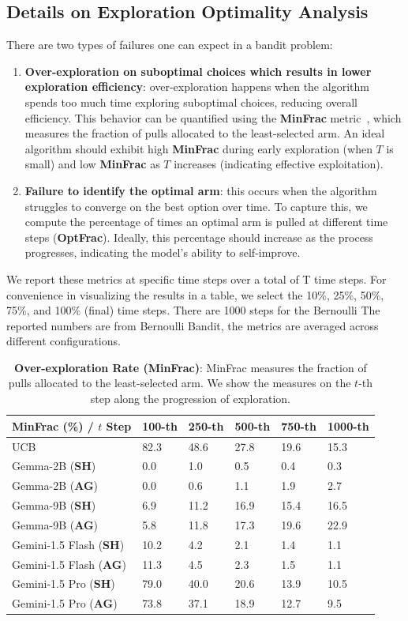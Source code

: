 \documentclass[11pt, logo]{googledeepmind}
\newcommand{\SH}{\textbf{SH}\xspace}
\newcommand{\AG}{\textbf{AG}\xspace}
\theoremstyle{plain}
\theoremstyle{definition}
\begin{document}
\subsection{Details on Exploration Optimality Analysis}
\label{app:sec:optimality}
There are two types of failures one can expect in a bandit problem:
\begin{enumerate}
    \item \textbf{Over-exploration on suboptimal choices which results in lower exploration efficiency}: over-exploration happens when the algorithm spends too much time exploring suboptimal choices, reducing overall efficiency. This behavior can be quantified using the \textbf{MinFrac} metric~\citep{krishnamurthy2024can}, which measures the fraction of pulls allocated to the least-selected arm. An ideal algorithm should exhibit high \textbf{MinFrac} during early exploration (when $T$ is small) and low \textbf{MinFrac} as $T$ increases (indicating effective exploitation).
    \item \textbf{Failure to identify the optimal arm}: this occurs when the algorithm struggles to converge on the best option over time. To capture this, we compute the percentage of times an optimal arm is pulled at different time steps (\textbf{OptFrac}). Ideally, this percentage should increase as the process progresses, indicating the model's ability to self-improve.
\end{enumerate}
We report these metrics at specific time steps over a total of T time steps. For convenience in visualizing the results in a table, we select the 10\%, 25\%, 50\%, 75\%, and 100\% (final) time steps. There are 1000 steps for the Bernoulli  The reported numbers are from Bernoulli Bandit, the metrics are averaged across different configurations.
\begin{table}[h]
\small
\centering
\begin{tabular}{@{}llllll@{}}
\toprule
MinFrac (\%) / $t$ Step         & 100-th   & 250-th   & 500-th   & 750-th   & 1000-th                                 \\ \midrule
UCB & 82.3 & 48.6 & 27.8 & 19.6 & 15.3 \\ \midrule
Gemma-2B (\SH) & 0.0 & 1.0 & 0.5 & 0.4 & 0.3 \\
Gemma-2B (\AG) & 0.0 & 0.6 & 1.1 & 1.9 & 2.7 \\ \midrule
Gemma-9B (\SH) & 6.9 & 11.2 & 16.9 & 15.4 & 16.5 \\
Gemma-9B (\AG) & 5.8 & 11.8 & 17.3 & 19.6 & 22.9 \\ \midrule
Gemini-1.5 Flash (\SH)  & 10.2 & 4.2 & 2.1 & 1.4 & 1.1  \\
Gemini-1.5 Flash (\AG)  & 11.3 & 4.5 & 2.3 & 1.5 & 1.1 \\ \midrule
Gemini-1.5 Pro (\SH) &79.0 & 40.0 &20.6 &13.9&10.5 \\
Gemini-1.5 Pro (\AG) &73.8&37.1&18.9&12.7&9.5 \\
\bottomrule
\end{tabular}
\caption{\footnotesize{\textbf{Over-exploration Rate (MinFrac)}: MinFrac measures the fraction of pulls allocated to the least-selected arm. We show the measures on the $t$-th step along the progression of exploration.}}
\label{tab:full_optimality_minfrac}
\end{table}
\end{document}
